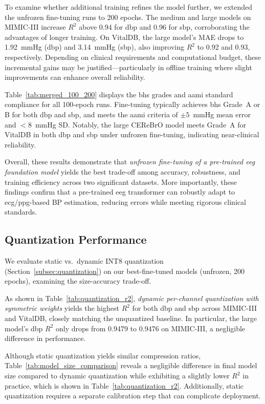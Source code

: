 To examine whether additional training refines the model further, we extended the unfrozen fine-tuning runs to 200 epochs. The medium and large models on MIMIC-III increase $R^2$ above 0.94 for \gls{dbp} and 0.96 for \gls{sbp}, corroborating the advantages of longer training. On VitalDB, the large model’s MAE drops to 1.92~mmHg (\gls{dbp}) and 3.14~mmHg (\gls{sbp}), also improving $R^2$ to 0.92 and 0.93, respectively. Depending on clinical requirements and computational budget, these incremental gains may be justified—particularly in offline training where slight improvements can enhance overall reliability.

Table~\ref{tab:merged_100_200} displays the \gls{bhs} grades and \gls{aami} standard compliance for all 100-epoch runs. Fine-tuning typically achieves \gls{bhs} Grade~A or B for both \gls{dbp} and \gls{sbp}, and meets the \gls{aami} criteria of $\pm5$~mmHg mean error and $<8$~mmHg SD. Notably, the large CEReBrO model meets Grade~A for VitalDB in both \gls{dbp} and \gls{sbp} under unfrozen fine-tuning, indicating near-clinical reliability.

Overall, these results demonstrate that \emph{unfrozen fine-tuning of a pre-trained \gls{eeg} foundation model} yields the best trade-off among accuracy, robustness, and training efficiency across two significant datasets. More importantly, these findings confirm that a pre-trained \gls{eeg} transformer can robustly adapt to \gls{ecg}/\gls{ppg}-based BP estimation, reducing errors while meeting rigorous clinical standards.



\subsection{Quantization Performance}\label{subsec:quant_restults}
We evaluate static vs.\ dynamic INT8 quantization (Section~\ref{subsec:quantization}) on our best-fine-tuned models (unfrozen, 200 epochs), examining the size-accuracy trade-off.

As shown in Table~\ref{tab:quantization_r2}, \emph{dynamic per-channel quantization with symmetric weights} yields the highest $R^2$ for both \gls{dbp} and \gls{sbp} across MIMIC-III and VitalDB, closely matching the unquantized baseline. In particular, the large model’s \gls{dbp} $R^2$ only drops from 0.9479 to 0.9476 on MIMIC-III, a negligible difference in performance.

Although static quantization yields similar compression ratios, Table~\ref{tab:model_size_comparison} reveals a negligible difference in final model size compared to dynamic quantization while exhibiting a slightly lower $R^2$ in practice, which is shown in Table~\ref{tab:quantization_r2}. Additionally, static quantization requires a separate calibration step that can complicate deployment.


